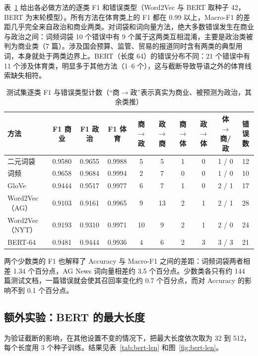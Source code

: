 \documentclass[lang=cn,a4paper]{elegantpaper}
\begin{document}
表~\ref{tab:perclass} 给出各必做方法的逐类 F1 和错误类型（Word2Vec 与 BERT 取种子 42，BERT 为末轮模型）。所有方法在体育类上的 F1 都在 0.99 以上，Macro-F1 的差距几乎完全来自政治和商业两类。对词袋和词向量方法，绝大多数错误发生在商业与政治之间：词频词袋 10 个错误中有 9 个属于这两类互相混淆，主要是政治类被判为商业类（7 篇）。涉及国会预算、监管、贸易的报道同时含有两类的典型用词，本身就处于两类边界上。BERT（长度 64）的错误分布不同：21 个错误中有 11 个涉及体育类，明显多于其他方法（1--6 个），这与截断导致导语之外的体育线索缺失相符。

\begin{table}[htbp]
  \centering
  \caption{测试集逐类 F1 与错误类型计数（“商$\to$政”表示真实为商业、被预测为政治，其余类推）}
  \label{tab:perclass}
  \footnotesize
  \setlength{\tabcolsep}{4pt}
  \begin{tabular}{lccccccccc}
    \toprule
    方法 & F1 商业 & F1 政治 & F1 体育 & 商$\to$政 & 政$\to$商 & 商$\to$体 & 政$\to$体 & 体$\to$商/政 & 错误数 \\
    \midrule
    二元词袋 & 0.9580 & 0.9655 & 0.9988 & 5 & 5 & 1 & 0 & 1 / 0 & 12 \\
    词频 & 0.9658 & 0.9684 & 0.9994 & 2 & 7 & 0 & 0 & 1 / 0 & 10 \\
    GloVe & 0.9444 & 0.9517 & 0.9977 & 6 & 7 & 1 & 0 & 2 / 1 & 17 \\
    Word2Vec（AG） & 0.9103 & 0.9161 & 0.9965 & 9 & 13 & 2 & 1 & 2 / 1 & 28 \\
    Word2Vec（NYT） & 0.9193 & 0.9310 & 0.9971 & 10 & 9 & 2 & 1 & 2 / 0 & 24 \\
    BERT-64 & 0.9481 & 0.9444 & 0.9936 & 4 & 6 & 2 & 3 & 3 / 3 & 21 \\
    \bottomrule
  \end{tabular}
\end{table}

两个少数类的 F1 也解释了 Accuracy 与 Macro-F1 之间的差距：词频词袋两者相差 1.34 个百分点，AG News 词向量相差约 3.5 个百分点。少数类各只有约 144 篇测试文档，一篇错误就会使其召回率变化约 0.7 个百分点，而对 Accuracy 的影响不到 0.1 个百分点。

\subsection{额外实验：BERT 的最大长度}

为验证截断的影响，在其他设置不变的情况下，把最大长度依次取为 32 到 512，每个长度用 3 个种子训练。结果见表~\ref{tab:bert-len} 和图~\ref{fig:bert-len}。
\end{document}

